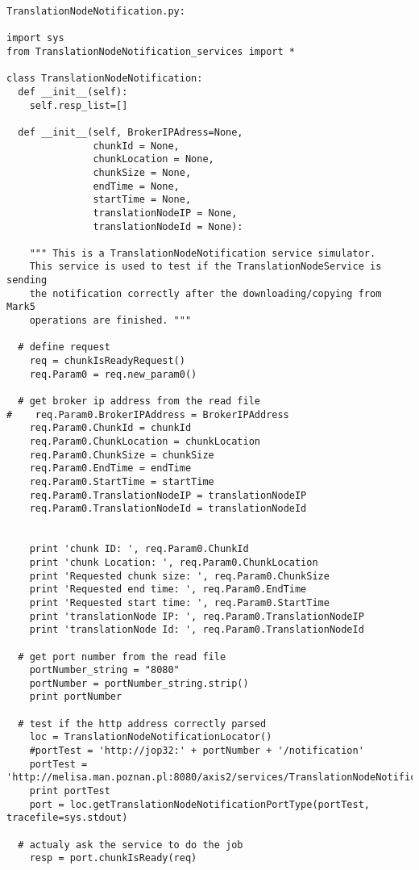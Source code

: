 \begin{verbatim}
TranslationNodeNotification.py:

import sys
from TranslationNodeNotification_services import *

class TranslationNodeNotification:
  def __init__(self):
    self.resp_list=[]

  def __init__(self, BrokerIPAdress=None, 
               chunkId = None, 
               chunkLocation = None, 
               chunkSize = None, 
               endTime = None, 
               startTime = None, 
               translationNodeIP = None, 
               translationNodeId = None):
    
    """ This is a TranslationNodeNotification service simulator. 
    This service is used to test if the TranslationNodeService is sending
    the notification correctly after the downloading/copying from Mark5 
    operations are finished. """
    
  # define request
    req = chunkIsReadyRequest()
    req.Param0 = req.new_param0()  

  # get broker ip address from the read file
#    req.Param0.BrokerIPAddress = BrokerIPAddress
    req.Param0.ChunkId = chunkId
    req.Param0.ChunkLocation = chunkLocation
    req.Param0.ChunkSize = chunkSize
    req.Param0.EndTime = endTime
    req.Param0.StartTime = startTime
    req.Param0.TranslationNodeIP = translationNodeIP
    req.Param0.TranslationNodeId = translationNodeId


    print 'chunk ID: ', req.Param0.ChunkId
    print 'chunk Location: ', req.Param0.ChunkLocation
    print 'Requested chunk size: ', req.Param0.ChunkSize
    print 'Requested end time: ', req.Param0.EndTime
    print 'Requested start time: ', req.Param0.StartTime
    print 'translationNode IP: ', req.Param0.TranslationNodeIP
    print 'translationNode Id: ', req.Param0.TranslationNodeId

  # get port number from the read file
    portNumber_string = "8080"
    portNumber = portNumber_string.strip()
    print portNumber

  # test if the http address correctly parsed
    loc = TranslationNodeNotificationLocator()
    #portTest = 'http://jop32:' + portNumber + '/notification'
    portTest =
'http://melisa.man.poznan.pl:8080/axis2/services/TranslationNodeNotification'
    print portTest
    port = loc.getTranslationNodeNotificationPortType(portTest,
tracefile=sys.stdout)

  # actualy ask the service to do the job
    resp = port.chunkIsReady(req)
\end{verbatim} 

